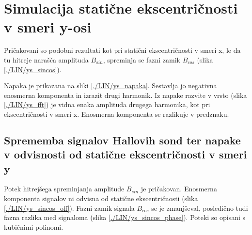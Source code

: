 \section{Simulacija statične ekscentričnosti v smeri y-osi}

Pričakovani so podobni rezultati kot pri statični ekscentričnosti v smeri x, le da tu hitreje narašča amplituda $B_{sin}$, spreminja se fazni zamik $B_{cos}$ (slika \ref{./LIN/ys_sincos}).
 

Napaka je prikazana na sliki \ref{./LIN/ys_napaka}. Sestavlja jo negativna enosmerna komponenta in izrazit drugi harmonik. Iz napake razvite v vrsto (slika \ref{./LIN/ys_fft}) je vidna enaka amplituda drugega harmonika, kot pri ekscentričnosti v smeri x. Enosmerna komponenta se razlikuje v predznaku.
\newpage
\subsection{Sprememba signalov Hallovih sond ter napake v odvisnosti od statične ekscentričnosti v smeri y}

Potek hitrejšega spreminjanja amplitude $B_{sin}$ je pričakovan. Enosmerna komponenta signalov ni odvisna od statične ekscentričnosti (slika \ref{./LIN/ys_sincos_off}). Fazni zamik signala $B_{cos}$ se je zmanjševal, posledično tudi fazna razlika med signaloma (slika \ref{./LIN/ys_sincos_phase}). Poteki so opisani s kubičnimi polinomi.

